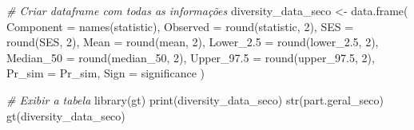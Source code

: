 \documentclass[
  letterpaper,
  DIV=11,
  numbers=noendperiod]{scrartcl}
\newenvironment{Shaded}{}{}
\newcommand{\AttributeTok}[1]{\textcolor[rgb]{0.49,0.56,0.16}{#1}}
\newcommand{\CommentTok}[1]{\textcolor[rgb]{0.38,0.63,0.69}{\textit{#1}}}
\newcommand{\DecValTok}[1]{\textcolor[rgb]{0.25,0.63,0.44}{#1}}
\newcommand{\FloatTok}[1]{\textcolor[rgb]{0.25,0.63,0.44}{#1}}
\newcommand{\FunctionTok}[1]{\textcolor[rgb]{0.02,0.16,0.49}{#1}}
\newcommand{\NormalTok}[1]{#1}
\newcommand{\OtherTok}[1]{\textcolor[rgb]{0.00,0.44,0.13}{#1}}
\begin{document}
\begin{Shaded}
\begin{Highlighting}[numbers=left,,]
\CommentTok{\# Criar dataframe com todas as informações}
\NormalTok{diversity\_data\_seco }\OtherTok{\textless{}{-}} \FunctionTok{data.frame}\NormalTok{(}
  \AttributeTok{Component =} \FunctionTok{names}\NormalTok{(statistic),}
  \AttributeTok{Observed =} \FunctionTok{round}\NormalTok{(statistic, }\DecValTok{2}\NormalTok{),}
  \AttributeTok{SES =} \FunctionTok{round}\NormalTok{(SES, }\DecValTok{2}\NormalTok{),}
  \AttributeTok{Mean =} \FunctionTok{round}\NormalTok{(mean, }\DecValTok{2}\NormalTok{),}
  \AttributeTok{Lower\_2.5 =} \FunctionTok{round}\NormalTok{(lower\_2}\FloatTok{.5}\NormalTok{, }\DecValTok{2}\NormalTok{),}
  \AttributeTok{Median\_50 =} \FunctionTok{round}\NormalTok{(median\_50, }\DecValTok{2}\NormalTok{),}
  \AttributeTok{Upper\_97.5 =} \FunctionTok{round}\NormalTok{(upper\_97}\FloatTok{.5}\NormalTok{, }\DecValTok{2}\NormalTok{),}
  \AttributeTok{Pr\_sim =}\NormalTok{ Pr\_sim,}
  \AttributeTok{Sign =}\NormalTok{ significance}
\NormalTok{)}

\CommentTok{\# Exibir a tabela}
\FunctionTok{library}\NormalTok{(gt)}
\FunctionTok{print}\NormalTok{(diversity\_data\_seco)}
\FunctionTok{str}\NormalTok{(part.geral\_seco)}
\FunctionTok{gt}\NormalTok{(diversity\_data\_seco)}


\end{Highlighting}
\end{Shaded}
\end{document}
